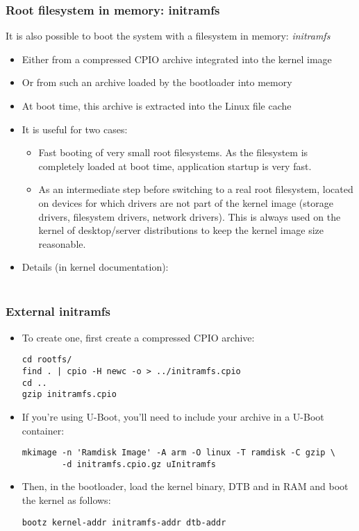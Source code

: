 \begin{frame}
  \frametitle{Root filesystem in memory: initramfs}
  It is also possible to boot the system with a filesystem in memory:
  {\em initramfs}
  \begin{itemize}
  \item Either from a compressed CPIO archive integrated into the kernel image
  \item Or from such an archive loaded by the bootloader into memory
  \item At boot time, this archive is extracted into the Linux file cache
  \item It is useful for two cases:
    \begin{itemize}
    \item Fast booting of very small root filesystems. As the
      filesystem is completely loaded at boot time, application
      startup is very fast.
    \item As an intermediate step before switching to a real root
      filesystem, located on devices for which drivers are not part of the
      kernel image (storage drivers, filesystem drivers,
      network drivers). This is always used on the kernel of
      desktop/server distributions to keep the kernel image size
      reasonable.
    \end{itemize}
  \item Details (in kernel documentation): \\
    \\
  \end{itemize}
\end{frame}

\begin{frame}[fragile]
  \frametitle{External initramfs}
  \begin{itemize}
  \item To create one, first create a compressed CPIO archive:
 \begin{verbatim}
cd rootfs/
find . | cpio -H newc -o > ../initramfs.cpio
cd ..
gzip initramfs.cpio
\end{verbatim}
  \item If you're using U-Boot, you'll need to include your archive
  in a U-Boot container:
  \begin{verbatim}
mkimage -n 'Ramdisk Image' -A arm -O linux -T ramdisk -C gzip \
        -d initramfs.cpio.gz uInitramfs
\end{verbatim}
  \item Then, in the bootloader, load the kernel binary, DTB and
  \code{uInitramfs} in RAM and boot the kernel as follows:
  \begin{verbatim}
bootz kernel-addr initramfs-addr dtb-addr
\end{verbatim}
  \end{itemize}
\end{frame}

